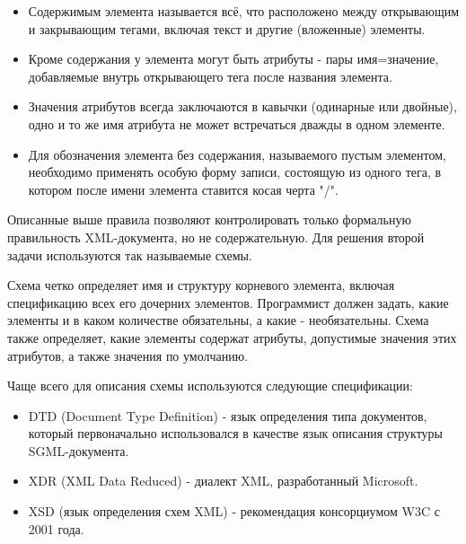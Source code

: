 \documentclass[12pt,a4paper,oneside]{article} %
\begin{document}
\begin{itemize}
\item Содержимым элемента называется всё, что расположено \linebreak
между открывающим и закрывающим тегами, включая текст и \linebreak
другие (вложенные) элементы.

\item	Кроме содержания у элемента могут быть атрибуты - пары\linebreak
имя=значение, добавляемые внутрь открывающего тега после \linebreak
названия элемента.

\item	Значения атрибутов всегда заключаются в кавычки (одинарные или\linebreak
двойные), одно и то же имя атрибута не может встречаться дважды\linebreak
в одном элементе.

\item	Для обозначения элемента без содержания, называемого пустым \linebreak
элементом, необходимо применять особую форму записи, состоящую из \linebreak
одного тега, в котором после имени элемента ставится косая черта "/".
\end{itemize}

Описанные выше правила позволяют контролировать только формальную \linebreak
правильность XML-документа, но не содержательную. Для решения \linebreak
второй задачи используются так называемые схемы.

Схема четко определяет имя и структуру корневого элемента, включая\linebreak
спецификацию всех его дочерних элементов. Программист должен задать, \linebreak
какие элементы и в каком количестве обязательны, а какие - \linebreak
необязательны. Схема также определяет, какие элементы содержат\linebreak
атрибуты, допустимые значения этих атрибутов, а также значения\linebreak
по умолчанию.

Чаще всего для описания схемы используются следующие спецификации:
\begin{itemize}
\item	DTD (Document Type Definition) - язык определения типа \linebreak
документов, который первоначально использовался в качестве язык \linebreak
описания структуры SGML-документа.
\item	XDR (XML Data Reduced) - диалект XML, разработанный Microsoft.
\item	XSD (язык определения схем XML) - рекомендация консорциумом W3C\linebreak
 с 2001 года.
\end{itemize}
\end{document}
